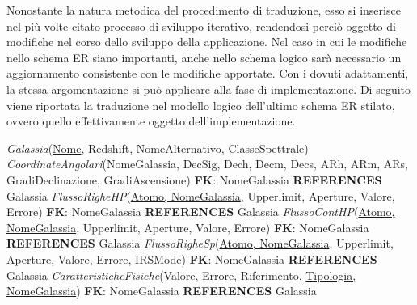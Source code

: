 \documentclass[12pt,a4paper,onecolumn,x11names]{article}
\begin{document}
\begin{flushleft}
		Nonostante la natura metodica del procedimento di traduzione, esso si inserisce nel più volte citato processo di sviluppo iterativo, rendendosi perciò oggetto di modifiche nel corso dello sviluppo della applicazione. Nel caso in cui le modifiche nello schema ER siano importanti, anche nello schema logico sarà necessario un aggiornamento consistente con le modifiche apportate. Con i dovuti adattamenti, la stessa argomentazione si può applicare alla fase di implementazione.\newline
		Di seguito viene riportata la traduzione nel modello logico dell'ultimo schema ER stilato, ovvero quello effettivamente oggetto dell'implementazione.\newline\newline
		\begin{framed}
			\textsf{\textit{Galassia}(\underline{Nome}, Redshift, NomeAlternativo, ClasseSpettrale)}\newline\newline
			\textsf{\textit{CoordinateAngolari}(NomeGalassia, DecSig, Dech, Decm, Decs, ARh, ARm, ARs, GradiDeclinazione, GradiAscensione)}\newline
			\textsf{\textbf{FK}: NomeGalassia \textbf{REFERENCES} Galassia}\newline\newline
			\textsf{\textit{FlussoRigheHP}(\underline{Atomo, NomeGalassia}, Upperlimit, Aperture, Valore, Errore)}\newline
			\textsf{\textbf{FK}: NomeGalassia \textbf{REFERENCES} Galassia}\newline\newline
			\textsf{\textit{FlussoContHP}(\underline{Atomo, NomeGalassia}, Upperlimit, Aperture, Valore, Errore)}\newline
			\textsf{\textbf{FK}: NomeGalassia \textbf{REFERENCES} Galassia}\newline\newline
			\textsf{\textit{FlussoRigheSp}(\underline{Atomo, NomeGalassia}, Upperlimit, Aperture, Valore, Errore, IRSMode)}\newline
			\textsf{\textbf{FK}: NomeGalassia \textbf{REFERENCES} Galassia}\newline\newline
			\textsf{\textit{CaratteristicheFisiche}(Valore, Errore, Riferimento, \underline{Tipologia, NomeGalassia})}\newline
			\textsf{\textbf{FK}: NomeGalassia \textbf{REFERENCES} Galassia}\newline
		\end{framed}	
	\end{flushleft}
\end{document}
